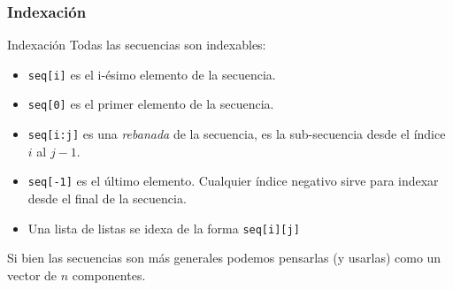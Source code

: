 \documentclass{beamer}
\begin{document}
\begin{frame}[fragile]
    \frametitle{Indexación}
    \begin{block}{Indexación}
    Todas las secuencias son indexables:
    \begin{itemize} 
        \item \texttt{seq[i]} es el i-ésimo elemento de la secuencia.
        \item \texttt{seq[0]} es el primer elemento de la secuencia.
        \item \texttt{seq[i:j]} es una {\em rebanada} de la secuencia, es la sub-secuencia desde
        el índice $i$ \alert{al $j-1$}.
        \item \texttt{seq[-1]} es el último elemento. Cualquier índice negativo
        sirve para indexar desde el final de la secuencia.
        \item Una lista de listas se idexa de la forma \texttt{seq[i][j]}
    \end{itemize}
    Si bien las secuencias son más generales podemos pensarlas (y usarlas) como un vector de $n$ componentes.
    \end{block}
    \end{frame}
\end{document}
